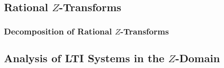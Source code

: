 \subsection{Rational \texorpdfstring{$Z$-Transforms}{Z-Transform}}\label{subsec:Rational Z-Transforms}
\subsubsection{Decomposition of Rational \texorpdfstring{$Z$-Transforms}{Z-Transform}}\label{subsubsec:Decompose Rational Z-Transforms}

\subsection{Analysis of LTI Systems in the \texorpdfstring{$Z$-Domain}{Z-Transform}}\label{subsec:Analysis LTI Systems Z-Domain}

